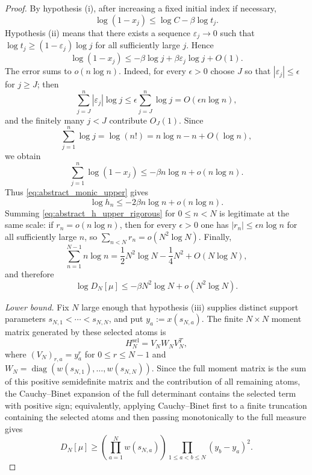 \documentclass[preprint,12pt]{elsarticle}
\numberwithin{equation}{section}
\theoremstyle{plain}
\theoremstyle{definition}
\theoremstyle{remark}
\begin{document}
\begin{proof}
By hypothesis (i), after increasing a fixed initial index if necessary,
\begin{equation}
\log(1-x_j)\le \log C-\beta\log t_j.
\end{equation}
Hypothesis (ii) means that there exists a sequence $\varepsilon_j\to0$ such that
$\log t_j\ge(1-\varepsilon_j)\log j$ for all sufficiently large $j$.  Hence
\begin{equation}
\log(1-x_j)
\le-\beta\log j+\beta\varepsilon_j\log j+O(1).
\label{eq:abstract_point_upper_explicit}
\end{equation}
The error sums to $o(n\log n)$.  Indeed, for every $\epsilon>0$ choose $J$ so that $|\varepsilon_j|\le\epsilon$ for $j\ge J$; then
\begin{equation}
\sum_{j=J}^{n}|\varepsilon_j|\log j
\le\epsilon\sum_{j=J}^{n}\log j
=O(\epsilon n\log n),
\end{equation}
and the finitely many $j<J$ contribute $O_J(1)$.  Since
\begin{equation}
\sum_{j=1}^{n}\log j=\log(n!)=n\log n-n+O(\log n),
\end{equation}
we obtain
\begin{equation}
\sum_{j=1}^{n}\log(1-x_j)
\le-\beta n\log n+o(n\log n).
\end{equation}
Thus \eqref{eq:abstract_monic_upper} gives
\begin{equation}
\log h_n\le-2\beta n\log n+o(n\log n).
\label{eq:abstract_h_upper_rigorous}
\end{equation}
Summing \eqref{eq:abstract_h_upper_rigorous} for $0\le n<N$ is legitimate at the same scale: if $r_n=o(n\log n)$, then for every $\epsilon>0$ one has $|r_n|\le\epsilon n\log n$ for all sufficiently large $n$, so
$\sum_{n<N}r_n=o(N^2\log N)$.  Finally,
\begin{equation}
\sum_{n=1}^{N-1}n\log n
=\frac12N^2\log N-\frac14N^2+O(N\log N),
\end{equation}
and therefore
\begin{equation}
\log D_N[\mu]
\le-\beta N^2\log N+o(N^2\log N).
\label{eq:abstract_det_upper}
\end{equation}

\emph{Lower bound.}
Fix $N$ large enough that hypothesis (iii) supplies distinct support parameters
$s_{N,1}<\cdots<s_{N,N}$, and put $y_a:=x(s_{N,a})$.  The finite $N\times N$ moment matrix generated by these selected atoms is
\begin{equation}
H_N^{\mathrm{sel}}=V_NW_NV_N^T,
\end{equation}
where $(V_N)_{r,a}=y_a^{r}$ for $0\le r\le N-1$ and
$W_N=\operatorname{diag}(w(s_{N,1}),\ldots,w(s_{N,N}))$.  Since the full moment matrix is the sum of this positive semidefinite matrix and the contribution of all remaining atoms, the Cauchy--Binet expansion of the full determinant contains the selected term with positive sign; equivalently, applying Cauchy--Binet first to a finite truncation containing the selected atoms and then passing monotonically to the full measure gives
\begin{equation}
D_N[\mu]\ge
\left(\prod_{a=1}^{N}w(s_{N,a})\right)
\prod_{1\le a<b\le N}(y_b-y_a)^2.
\label{eq:abstract_one_term_lower}
\end{equation}


\end{proof}
\end{document}
